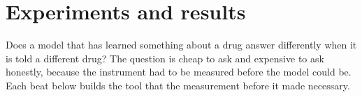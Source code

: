 %
%
%
%
%
\chapter{Experiments and results}
\label{sec:methods}
\label{sec:results}

\begin{question}
Does a model that has learned something about a drug answer differently when it
is told a different drug? The question is cheap to ask and expensive to ask
honestly, because the instrument had to be measured before the model could be.
Each beat below builds the tool that the measurement before it made necessary.
\end{question}

